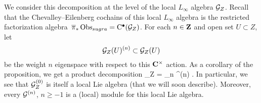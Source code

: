 We consider this decomposition at the level of the local $L_\infty$ algebra $\mathcal G_Z$.
Recall that the Chevalley--Eilenberg cochains of this local $L_\infty$ algebra is the restricted factorization algebra~$\overline{\pi}_* \operatorname{Obs}_{sugra} = {\rm C}^\bullet(\mathcal G_Z)$. 
For each $n \in \mathbf{Z}$ and open set $U \subset Z$, let 
\[
\mathcal G_Z(U)^{(n)}\subset \mathcal G_Z(U)
\]
be the weight $n$ eigenspace with respect to this $\mathbf{C}^\times$ action.
As a corollary of the proposition, we get a product decomposition 
\beqn
\label{eqn:Gdecomp}
\cG_Z = \prod_{n } \cG^{(n)} .
\eeqn
In particular, we see that $\mathcal G^{(0)}_Z$ is itself a local Lie algebra (that we will soon describe). 
Moreover, every $\mathcal G^{(n)}$, $n \geq -1$ is a (local) module for this local Lie algebra.


